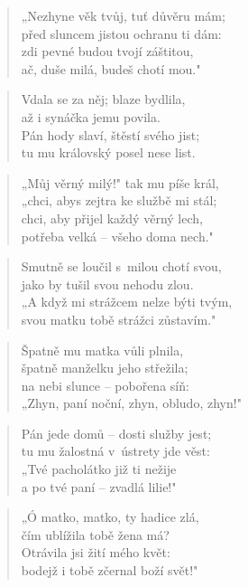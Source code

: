 \begin{verse}
„Nezhyne věk tvůj, tuť důvěru mám; \\
před sluncem jistou ochranu ti dám: \\
zdi pevné budou tvojí záštitou, \\
ač, duše milá, budeš chotí mou."
\end{verse}

\begin{verse}
Vdala se za něj; blaze bydlila, \\
až i synáčka jemu povila. \\
Pán hody slaví, štěstí svého jist; \\
tu mu královský posel nese list.
\end{verse}

\begin{verse}
„Můj věrný milý!" tak mu píše král, \\
„chci, abys zejtra ke službě mi stál; \\
chci, aby přijel každý věrný lech, \\
potřeba velká -- všeho doma nech."
\end{verse}

\begin{verse}
Smutně se loučil s~milou chotí svou, \\
jako by tušil svou nehodu zlou. \\
„A když mi strážcem nelze býti tvým, \\
svou matku tobě strážci zůstavím."
\end{verse}

\begin{verse}
Špatně mu matka vůli plnila, \\
špatně manželku jeho střežila; \\
na nebi slunce -- pobořena síň: \\
„Zhyn, paní noční, zhyn, obludo, zhyn!"
\end{verse}

\begin{verse}
Pán jede domů -- dosti služby jest; \\
tu mu žalostná v~ústrety jde věst: \\
„Tvé pacholátko již ti nežije \\
a po tvé paní -- zvadlá lilie!"
\end{verse}

\begin{verse}
„Ó matko, matko, ty hadice zlá, \\
čím ublížila tobě žena má? \\
Otrávila jsi žití mého květ: \\
bodejž i tobě zčernal boží svět!"
\end{verse}
